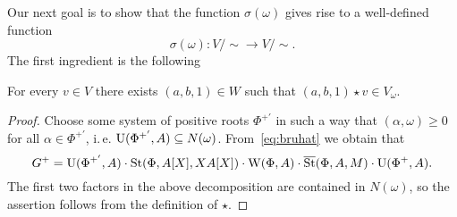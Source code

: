 \begin{comment}
We will also need to compute $x^{-1} \cdot \chi_{\omega, X}(x)$ for the representative $x = h_{\alpha_k}(u)\iota(w_\lambda)$. For simplicity, we may assume $w_\lambda = w_\beta(1)$, $\beta \in \Sigma_k$.
\begin{multline} x^{-1} \cdot \chi_{\omega, X}(x) = \{ X, u\} \cdot \iota(w_\lambda)^{-1} \chi_{\omega, X}(w_\lambda) = \\ = \{X, u\} \cdot w_\beta(1)^{-1} w_\beta(X)
\end{multline}
\end{comment}


Our next goal is to show that the function $\sigma(\omega)$ gives rise to a well-defined function
 \[\sigma(\omega)\colon V/\sim \to V/\sim.\]
The first ingredient is the following
\begin{lemma}
 For every $v \in V$ there exists $(a, b, 1) \in W$ such that $(a, b, 1) \star v \in V_\omega$.
\end{lemma}
\begin{proof}
 Choose some system of positive roots $\Phi^{+'}$ in such a way that $(\alpha, \omega) \geq 0$ for all $\alpha \in \Phi^{+'}$, i.\,e. $\operatorname{U}(\Phi^{+'}, A) \subseteq N(\omega)$.
 From~\eqref{eq:bruhat} we obtain that \[G^+ = \operatorname{U}(\Phi^{+'}, A)\cdot \operatorname{St}(\Phi, A[X], XA[X]) \cdot \operatorname{W}(\Phi,A)\cdot \overline{\operatorname{St}}(\Phi, A, M) \cdot\operatorname{U}(\Phi^+, A).\]
 The first two factors in the above decomposition are contained in $N(\omega)$, so the assertion follows from the definition of $\star$.
\end{proof}


